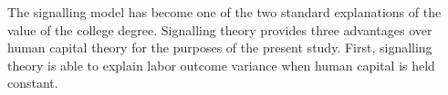 \documentclass[review]{elsarticle}
\begin{document}




The signalling model has become one of the two standard explanations of the value of the college degree.
Signalling theory provides three advantages over human capital theory for the purposes of the present study.
First, signalling theory is able to explain labor outcome variance when human capital is held constant.
\end{document}

